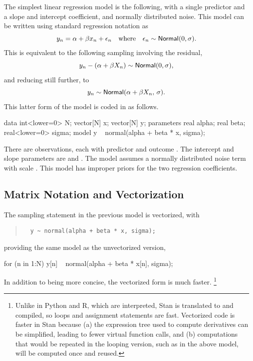 The simplest linear regression model is the following, with a single
predictor and a slope and intercept coefficient, and normally
distributed noise.  This model can be written using standard
regression notation as
%
\[
y_n = \alpha + \beta x_n + \epsilon_n
\ \ \ \mbox{where} \ \ \ 
\epsilon_n \sim \distro{Normal}(0,\sigma).
\]
This is equivalent to the following sampling involving the
residual,
\[
y_n - (\alpha + \beta X_n) \sim \distro{Normal}(0,\sigma),
\]
and reducing still further, to
\[
y_n \sim \distro{Normal}(\alpha + \beta X_n, \, \sigma).
\]
%
This latter form of the model is coded in \Stan as follows.
%
\begin{stancode}
data {
  int<lower=0> N;
  vector[N] x;
  vector[N] y;
}
parameters {
  real alpha;
  real beta;
  real<lower=0> sigma;
}
model {
  y ~ normal(alpha + beta * x, sigma);
}
\end{stancode}
%
There are  observations, each with predictor  and
outcome \code{y[n]}.  The intercept and slope parameters are
 and .  The model assumes a normally
distributed noise term with scale .  This model has
improper priors for the two regression coefficients.

\subsection{Matrix Notation and Vectorization}

The sampling statement in the previous model is vectorized, with
%
\begin{quote}
\begin{Verbatim}
  y ~ normal(alpha + beta * x, sigma);
\end{Verbatim}
\end{quote}
%
providing the same model as the unvectorized version,
%
\begin{stancode}
  for (n in 1:N)
    y[n] ~ normal(alpha + beta * x[n], sigma);
\end{stancode}
%
In addition to being more concise, the vectorized form is much faster.%
%
\footnote{Unlike in Python and R, which are interpreted, Stan is
  translated to \Cpp and compiled, so loops and assignment statements
  are fast.  Vectorized code is faster in Stan because (a) the
  expression tree used to compute derivatives can be simplified,
  leading to fewer virtual function calls, and (b) computations that
  would be repeated in the looping version, such as \code{log(sigma)}
  in the above model, will be computed once and reused.}

